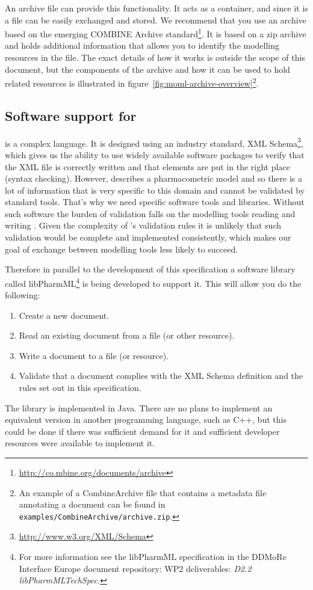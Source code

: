An archive file can provide this functionality. It acts as a
container, and since it is a file can be easily exchanged and
stored. We recommend that you use an archive based on the emerging
COMBINE Archive
standard\footnote{\url{http://co.mbine.org/documents/archive}}. It is
based on a zip archive and holds additional information that allows
you to identify the modelling resources in the file. The exact details
of how it works is outside the scope of this document, but the
components of the archive and how it can be used to hold \pharmml
related resources is illustrated in
figure~\ref{fig:moml-archive-overview}\footnote{An example of a
  CombineArchive file that contains a metadata file annotating a
  \pharmml document can be found in \texttt{examples/CombineArchive/archive.zip}.}.

\subsection{Software support for \pharmml}
\label{sec:libpharmml}

\pharmml is a complex language. It is designed using an industry
standard, XML Schema\footnote{\url{http://www.w3.org/XML/Schema}}, which gives us the
ability to use widely available software packages to verify that the
XML file is correctly written and that elements are put in the right
place (syntax checking). However, \pharmml describes a pharmacometric
model and so there is a lot of information that is very specific to
this domain and cannot be validated by standard tools.  That's why we need
\pharmml specific software tools and libraries. Without such software
the burden of validation falls on the modelling tools reading and
writing \pharmml. Given the complexity of \pharmml's validation rules
it is unlikely that such validation would be complete and implemented
consistently, which makes our goal of exchange between modelling
tools less likely to succeed.

Therefore in parallel to the development of this specification a
software library called libPharmML\footnote{For more information see
  the libPharmML specification in the DDMoRe Interface Europe
  document repository: WP2 deliverables: \emph{D2.2
    libPharmMLTechSpec}.} is being developed to support it.  This will
allow you do the following:
%
\begin{enumerate}
\item Create a new \pharmml document.
\item Read an existing \pharmml document from a file (or other
  resource).
\item Write a \pharmml document to a file (or resource).
\item Validate that a \pharmml document complies with the XML Schema
  definition and the rules set out in this specification.
\end{enumerate}
%
The library is implemented in Java. There are no plans to implement an equivalent
version in another programming language, such as C++, but this could be done if
there was sufficient demand for it and sufficient developer resources were available
to implement it.
